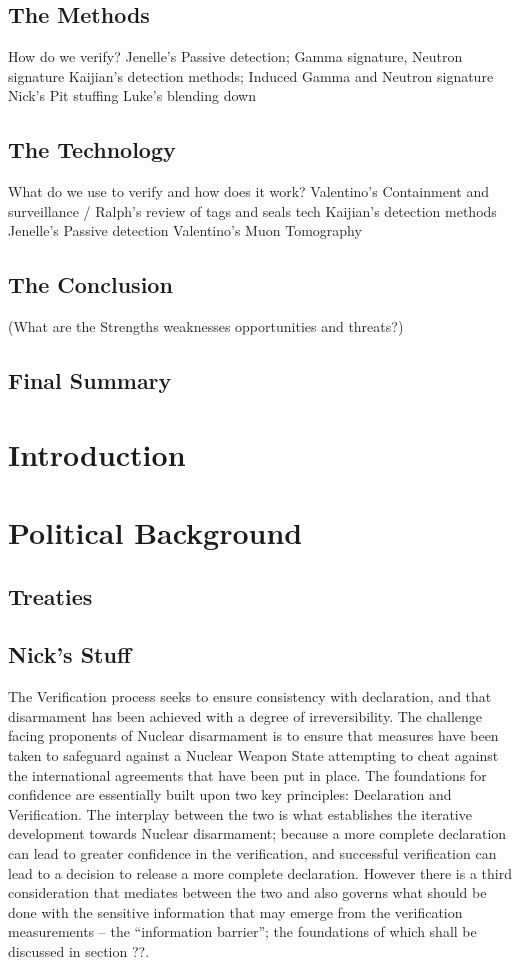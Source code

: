 \documentclass[a4paper]{article}
\begin{document}
\subsection*{The Methods}
	How do we verify?
Jenelle’s Passive detection; Gamma signature, Neutron signature
Kaijian’s detection methods; Induced Gamma and Neutron signature 
Nick’s Pit stuffing
Luke’s blending down
\subsection*{The Technology}
	What do we use to verify and how does it work?
Valentino’s Containment and surveillance / Ralph’s review of tags and seals tech
Kaijian’s detection methods
Jenelle’s Passive detection
Valentino’s Muon Tomography 
\subsection*{The Conclusion}
	(What are the Strengths weaknesses opportunities and threats?)
\subsection*{Final Summary}

\tableofcontents

\section{Introduction}

\section{Political Background}
\subsection{Treaties}

\subsection{Nick's Stuff}
The Verification process seeks to ensure consistency with declaration, 
and that disarmament has been achieved with a degree of irreversibility. 
The challenge facing proponents of Nuclear disarmament is to ensure that 
measures have been taken to safeguard against a Nuclear Weapon State 
attempting to cheat against the international agreements that have been 
put in place. The foundations for confidence are essentially built upon 
two key principles: Declaration and Verification. The interplay between 
the two is what establishes the iterative development towards Nuclear 
disarmament; because a more complete declaration can lead to greater 
confidence in the verification, and successful verification can lead to a 
decision to release a more complete declaration. However there is a third 
consideration that mediates between the two and also governs what should be 
done with the sensitive information that may emerge from the verification 
measurements -- the ``information barrier''; the foundations of which shall 
be discussed in section ??. 
\end{document}
